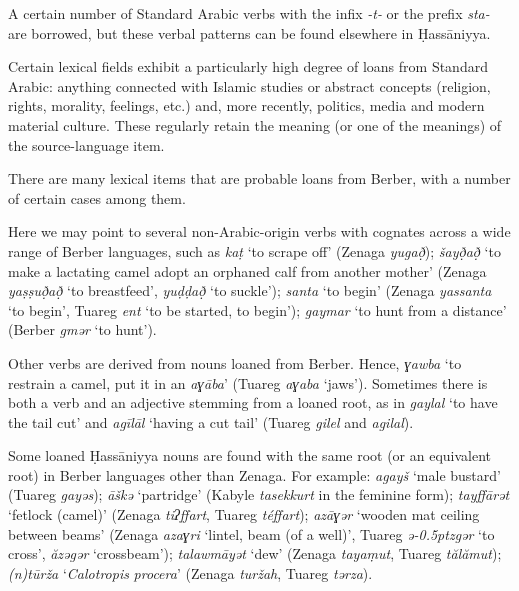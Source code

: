 \documentclass[output=paper]{langsci/langscibook}
\begin{document}
A certain number of Standard Arabic verbs with the infix \textit{{}-}\textit{t-} or the prefix \textit{sta-} are borrowed, but these verbal patterns can be found elsewhere in Ḥassāniyya. 

Certain lexical fields exhibit a particularly high degree of loans from Standard Arabic: anything connected with Islamic studies or abstract concepts (religion, rights, morality, feelings, etc.) and, more recently, politics, media and modern material culture. These regularly retain the meaning (or one of the meanings) of the source-language item. 


There are many lexical items that are probable loans from Berber, with a number of certain cases among them. 

Here we may point to several non-Arabic-origin verbs with cognates across a wide range of Berber languages, such as \textit{k{\R}aṭ} ‘to scrape off’ (Zenaga \textit{yug{\R}að̣}); \textit{šayð̣að̣} ‘to make a lactating camel adopt an orphaned calf from another mother’ (Zenaga \textit{yaṣṣuð̣að̣} ‘to breastfeed’, \textit{yuḍḍað̣} ‘to suckle’); \textit{santa} ‘to begin’ (Zenaga \textit{yassanta} ‘to begin’, Tuareg \textit{ent} ‘to be started, to begin’); \textit{gaymar} ‘to hunt from a distance’ (Berber \textit{gmər} ‘to hunt'). 

Other verbs are derived from nouns loaned from Berber. Hence, \textit{ɣawba} ‘to restrain a camel, put it in an \textit{aɣāba}’ (Tuareg \textit{aɣaba} ‘jaws’). Sometimes there is both a verb and an adjective stemming from a loaned root, as in \textit{gaylal} ‘to have the tail cut’ and \textit{agīlāl} ‘having a cut tail’ (Tuareg \textit{gilel} and \textit{agilal}). 

Some loaned Ḥassāniyya nouns are found with the same root (or an equivalent root) in Berber languages other than Zenaga. For example: \textit{agayš} ‘male bustard’ (Tuareg \textit{gayəs}); \textit{āškə{\R}} ‘partridge’ (Kabyle \textit{tasekkurt} in the feminine form); \textit{tayffārət} ‘fetlock (camel)’ (Zenaga \textit{tiʔffart}, Tuareg \textit{téffart}); \textit{azāɣər} ‘wooden mat ceiling between beams’ (Zenaga \textit{azaɣri} ‘lintel, beam (of a well)’, Tuareg \textit{ǝ\kern -0.5ptzgər} ‘to cross’, \textit{ăzəgər} ‘crossbeam’); \textit{talawmāyət} ‘dew’ (Zenaga \textit{tayaṃut}, Tuareg \textit{tălămut}); \textit{(n)tūrža} ‘\textit{Calotropis} \textit{procera}’ (Zenaga \textit{turžah}, Tuareg \textit{tərza}).
\end{document}
